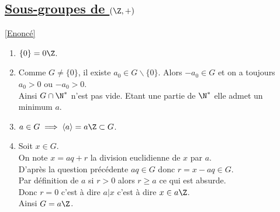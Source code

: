 \documentclass[8pt]{book}
\begin{document}
	\subsection{\underline{Sous-groupes de $(\Z,+)$} }
	\label{Sous-groupes de Z corrigé}
	\textcolor{blue}{\hyperref[Sous-groupes de (Z,+)]{[Enoncé]}}\\
	\begin{enumerate}[leftmargin=*]
		\item $\{0\}=0\Z$.
		\item Comme $G\ne \{0\}$, il existe $a_0\in G\backslash\{0\}$. Alors $-a_0\in G$ et on a toujours $a_0>0$ ou $-a_0>0$.\\
		Ainsi $G\cap \N^*$ n'est pas vide. Etant une partie de $\N^*$ elle admet un minimum $a$.
		\item $a\in G\implies \langle a\rangle=a\Z\subset G$.
		\item Soit $x\in G$.\\
		On note $x=aq+r$ la division euclidienne de $x$ par $a$.\\
		D'après la question précédente $aq\in G$ donc $r=x-aq\in G$.\\
		Par définition de $a$ si $r>0$ alors $r\geq a$ ce qui est absurde.\\
		Donc $r=0$ c'est à dire $a|x$ c'est à dire $x\in a\Z$.\\
		Ainsi $G=a\Z$.
	\end{enumerate}
	
\end{document}
